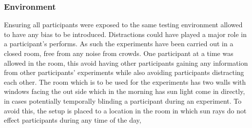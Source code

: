 \subsubsection{Environment}
Ensuring all participants were exposed to the same testing environment allowed to have any bias to be introduced. Distractions could have played a major role in a participant's performs. As such the experiments have been carried out in a closed room, free from any noise from crowds. One participant at a time was allowed in the room, this avoid having other participants gaining any information from other participants' experiments while also avoiding participants distracting each other. The room which is to be used for the experiments has two walls with windows facing the out side which in the morning has sun light come in directly, in cases potentially temporally blinding a participant during an experiment. To avoid this, the setup is placed to a location in the room in which sun rays do not effect participants during any time of the day,
	
